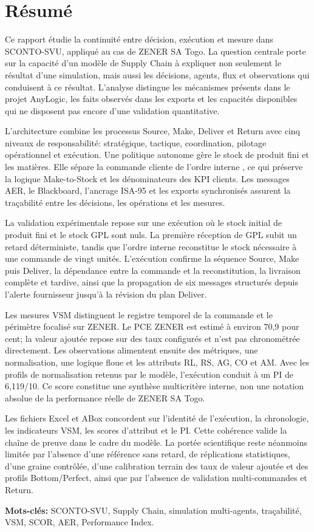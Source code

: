 \chapter*{Résumé}

Ce rapport étudie la continuité entre décision, exécution et mesure dans SCONTO-SVU, appliqué au cas de ZENER SA Togo. La question centrale porte sur la capacité d'un modèle de Supply Chain à expliquer non seulement le résultat d'une simulation, mais aussi les décisions, agents, flux et observations qui conduisent à ce résultat. L'analyse distingue les mécanismes présents dans le projet AnyLogic, les faits observés dans les exports et les capacités disponibles qui ne disposent pas encore d'une validation quantitative.

L'architecture combine les processus Source, Make, Deliver et Return avec cinq niveaux de responsabilité: stratégique, tactique, coordination, pilotage opérationnel et exécution. Une politique autonome gère le stock de produit fini et les matières. Elle sépare la commande cliente  de l'ordre interne , ce qui préserve la logique Make-to-Stock et les dénominateurs des KPI clients. Les messages AER, le Blackboard, l'ancrage ISA-95 et les exports synchronisés assurent la traçabilité entre les décisions, les opérations et les mesures.

La validation expérimentale repose sur une exécution où le stock initial de produit fini et le stock GPL sont nuls. La première réception de GPL subit un retard déterministe, tandis que l'ordre interne reconstitue le stock nécessaire à une commande de vingt unités. L'exécution confirme la séquence Source, Make puis Deliver, la dépendance entre la commande et la reconstitution, la livraison complète et tardive, ainsi que la propagation de six messages structurés depuis l'alerte fournisseur jusqu'à la révision du plan Deliver.

Les mesures VSM distinguent le registre temporel de la commande et le périmètre focalisé sur ZENER. Le PCE ZENER est estimé à environ 70,9 pour cent; la valeur ajoutée repose sur des taux configurés et n'est pas chronométrée directement. Les observations alimentent ensuite des métriques, une normalisation, une logique floue et les attributs RL, RS, AG, CO et AM. Avec les profils de normalisation retenus par le modèle, l'exécution conduit à un PI de 6,119/10. Ce score constitue une synthèse multicritère interne, non une notation absolue de la performance réelle de ZENER SA Togo.

Les fichiers Excel et ABox concordent sur l'identité de l'exécution, la chronologie, les indicateurs VSM, les scores d'attribut et le PI. Cette cohérence valide la chaîne de preuve dans le cadre du modèle. La portée scientifique reste néanmoins limitée par l'absence d'une référence sans retard, de réplications statistiques, d'une graine contrôlée, d'une calibration terrain des taux de valeur ajoutée et des profils Bottom/Perfect, ainsi que par l'absence de validation multi-commandes et Return.

\noindent\textbf{Mots-clés:} SCONTO-SVU, Supply Chain, simulation multi-agents, traçabilité, VSM, SCOR, AER, Performance Index.
